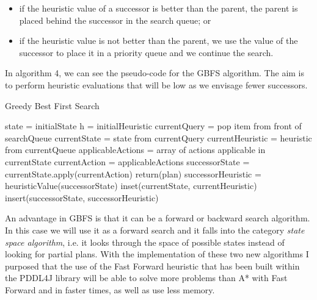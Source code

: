 \begin{itemize}
\item if the heuristic value of a successor is better than the parent, the parent is placed behind the successor in the search queue; or
\item if the heuristic value is not better than the parent, we use the value of the successor to place it in a priority queue and we continue the search.  
\end{itemize}
In algorithm 4, we can see the pseudo-code for the GBFS algorithm. The aim is to perform heuristic evaluations that will be low as we envisage fewer successors.\cite{GreedyOnline} 
\begin{algorithm}[H]
\caption{Greedy Best First Search}
\begin{algorithmic}
\State state = initialState 
\State h = initialHeuristic
\State currentQuery = pop item from front of searchQueue
\State currentState = state from currentQuery
\State currentHeuristic = heuristic from currentQueue
\State applicableActions = array of actions applicable in currentState
\State currentAction = applicableActions
\State successorState = currentState.apply(currentAction)
\State return(plan)
\EndIf
\State successorHeuristic = heuristicValue(successorState)
\State inset(currentState, currentHeuristic) 
\State insert(successorState, successorHeuristic)
\EndIf
\EndFor
\EndWhile
\end{algorithmic}
\end{algorithm}

An advantage in GBFS is that it can be a forward or backward search algorithm. In this case we will use it as a forward search and it falls into the category \textit{state space algorithm}, i.e. it looks through the space of possible states instead of looking for partial plans. With the implementation of these two new algorithms I purposed that the use of the Fast Forward heuristic that has been built within the PDDL4J library will be able to solve more problems than A* with Fast Forward and in faster times, as well as use less memory.

